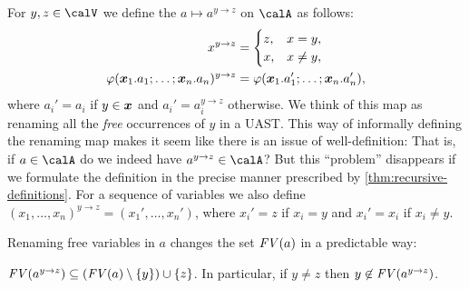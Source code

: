 \documentclass[a4paper, 11pt, article, danish, oneside]{memoir}
\DeclarePairedDelimiter{\auxdelimparen}{(}{)}
\newcommand*\union\cup
\renewcommand{\phi}{\varphi}
\newcommand{\setVar}{\calV}
\newcommand{\freevar}[2][]{\mathit{FV}\auxdelimparen[#1]{#2}}
\begin{document}
For $y,z \in \setVar$ we define the  $a \mapsto a^{y \to z}$ on $\calA$ as follows:
%
\begin{align*}
    x^{y \to z}
        &= \begin{cases}
            z, & x = y, \\
            x, & x \neq y,
        \end{cases} \\
    \phi(\seq{x}_1.a_1 ; \ldots ; \seq{x}_n.a_n)^{y \to z}
        &= \phi(\seq{x}_1.a_1' ; \ldots ; \seq{x}_n.a_n'),
\end{align*}
%
where $a_i' = a_i$ if $y \in \bm{x}$ and $a_i' = a_i^{y \to z}$ otherwise. We think of this map as renaming all the \emph{free} occurrences of $y$ in a UAST. This way of informally defining the renaming map makes it seem like there is an issue of well-definition: That is, if $a \in \calA$ do we indeed have $a^{y \to z} \in \calA$? But this \enquote{problem} disappears if we formulate the definition in the precise manner prescribed by \cref{thm:recursive-definitions}. For a sequence of variables we also define $(x_1, \ldots, x_n)^{y \to z} = (x_1', \ldots, x_n')$, where $x_i' = z$ if $x_i = y$ and $x_i' = x_i$ if $x_i \neq y$.

Renaming free variables in $a$ changes the set $\freevar{a}$ in a predictable way:

\begin{lemma}
    \label{lem:renaming-freevars}
    $\freevar{a^{y \to z}} \subseteq (\freevar{a} \setminus \{y\}) \union \{z\}$. In particular, if $y \neq z$ then $y \not\in \freevar{a^{y \to z}}$.
\end{lemma}
\end{document}
